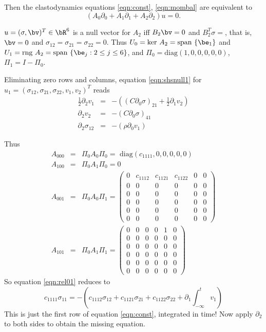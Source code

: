 Then the elastodynamics equations \ref{eqn:const}, \ref{eqn:mombal} are equivalent to
\[
  (A_0\partial_0 + A_1 \partial_1 + A_2 \partial_2)u =0.
\]

$u = (\sigma, \bv)^T \in \bR^6$ is a null vector for $A_2$ iff $B_2\bv = 0$ and $B_2^T \sigma=$, that is, $\bv=0$ and $\sigma_{12}=\sigma_{21}=\sigma_{22} = 0$. Thus $U_0= \mbox{ker }A_2 = \mbox{span } \{\be_1\}$ and  $U_1 = \mbox{rng }A_2 = \mbox{span }\{\be_j: 2\le j \le 6\}$, and $\Pi_0 = \mbox{diag}(1,0,0,0,0,0)$, $\Pi_1 = I-\Pi_0$.

Eliminating zero rows and columns, equation \ref{eqn:shsnull1} for $u_1 = (\sigma_{12}, \sigma_{21}, \sigma_{22}, v_1, v_2)^T$ reads
\begin{eqnarray}
  \frac{1}{2}\partial_2v_1 &=& -((C \partial_0 \sigma)_{21} + \frac{1}{2}\partial_1v_2)\\
  \partial_2 v_2 &=& -(C \partial_0 \sigma)_{41}\\
  \partial_2 \sigma_{12} &=& -(\rho \partial_0v_1)
\end{eqnarray}

Thus
\begin{eqnarray}
  A_{000} &=& \Pi_0 A_0 \Pi_0 = \mbox{ diag}(c_{1111},0,0,0,0,0) \nonumber \\
  A_{100} &=& \Pi_0 A_1 \Pi_0 = 0 \nonumber \\
  A_{001} &=& \Pi_0 A_0 \Pi_1 =
              \left(
              \begin{array}{cccccc}
                0 & c_{1112} & c_{1121} & c_{1122} & 0 & 0 \\
                0 & 0 & 0 & 0 & 0 & 0 \\
                0 & 0 & 0 & 0 & 0 & 0 \\                
                0 & 0 & 0 & 0 & 0 & 0 \\
                0 & 0 & 0 & 0 & 0 & 0 \\
                0 & 0 & 0 & 0 & 0 & 0
              \end{array}
                                    \right) \nonumber \\
  A_{101} &=& \Pi_0 A_1 \Pi_1 =
                            \left(
              \begin{array}{cccccc}
                0 & 0 & 0 & 0 & 1 & 0 \\
                0 & 0 & 0 & 0 & 0 & 0 \\
                0 & 0 & 0 & 0 & 0 & 0 \\                
                0 & 0 & 0 & 0 & 0 & 0 \\
                0 & 0 & 0 & 0 & 0 & 0 \\
                0 & 0 & 0 & 0 & 0 & 0
              \end{array}
                                    \right)
                                    \label{eqn:ela0}
\end{eqnarray}
So equation \ref{eqn:rel01} reduces to
\[
  c_{1111}\sigma_{11} = -(c_{1112}\sigma_{12} + c_{1121}\sigma_21 + c_{1122}\sigma_{22} + \partial_1 \int_{-\infty}^t v_1)
\]
This is just the first row of equation \ref{eqn:const}, integrated in time! Now apply $\partial_2$ to both sides to obtain the missing equation.

